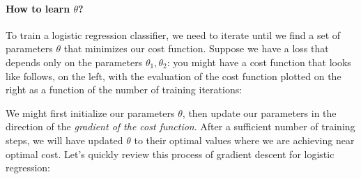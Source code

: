 \documentclass[12pt]{article}
\begin{document}
\paragraph{How to learn $\theta$?} To train a logistic regression classifier, we need to iterate until we find a set of parameters $\theta$ that minimizes our cost function. Suppose we have a loss that depends only on the parameters $\theta_1, \theta_2$: you might have a cost function that looks like follows, on the left, with the evaluation of the cost function plotted on the right as a function of the number of training iterations:

\begin{minipage}{1.0\textwidth}
  \begin{multicols}{2}
\vfill\null \columnbreak
{}
\end{multicols}
\end{minipage}

We might first initialize our parameters $\theta$, then update our parameters in the direction of the \emph{gradient of the cost function}. After a sufficient number of training steps, we will have updated $\theta$ to their optimal values where we are achieving near optimal cost. Let's quickly review this process of gradient descent for logistic regression:
\end{document}
